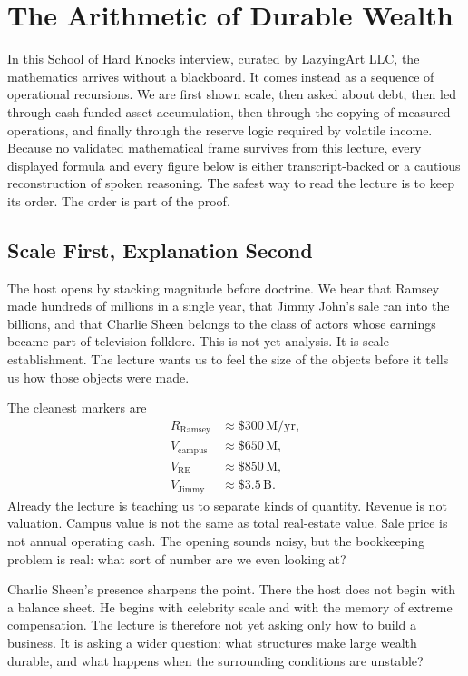 \chapter{The Arithmetic of Durable Wealth}

In this School of Hard Knocks interview, curated by LazyingArt LLC, the mathematics arrives without a blackboard. It comes instead as a sequence of operational recursions. We are first shown scale, then asked about debt, then led through cash-funded asset accumulation, then through the copying of measured operations, and finally through the reserve logic required by volatile income. Because no validated mathematical frame survives from this lecture, every displayed formula and every figure below is either transcript-backed or a cautious reconstruction of spoken reasoning. The safest way to read the lecture is to keep its order. The order is part of the proof.

\section{Scale First, Explanation Second}

The host opens by stacking magnitude before doctrine. We hear that Ramsey made hundreds of millions in a single year, that Jimmy John's sale ran into the billions, and that Charlie Sheen belongs to the class of actors whose earnings became part of television folklore. This is not yet analysis. It is scale-establishment. The lecture wants us to feel the size of the objects before it tells us how those objects were made.

The cleanest markers are
\begin{align}
R_{\mathrm{Ramsey}} &\approx \$300\,\mathrm{M/yr},\\
V_{\mathrm{campus}} &\approx \$650\,\mathrm{M},\\
V_{\mathrm{RE}} &\approx \$850\,\mathrm{M},\\
V_{\mathrm{Jimmy}} &\approx \$3.5\,\mathrm{B}.
\end{align}
Already the lecture is teaching us to separate kinds of quantity. Revenue is not valuation. Campus value is not the same as total real-estate value. Sale price is not annual operating cash. The opening sounds noisy, but the bookkeeping problem is real: what sort of number are we even looking at?

Charlie Sheen's presence sharpens the point. There the host does not begin with a balance sheet. He begins with celebrity scale and with the memory of extreme compensation. The lecture is therefore not yet asking only how to build a business. It is asking a wider question: what structures make large wealth durable, and what happens when the surrounding conditions are unstable?

